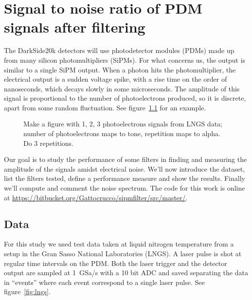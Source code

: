 \chapter{Signal to noise ratio of PDM signals after filtering}


The DarkSide20k detectors will use photodetector modules (PDMs) made up from
many silicon photomultipliers (SiPMs). For what concerns us, the output is
similar to a single SiPM output. When a photon hits the photomultiplier, the
electrical output is a sudden voltage spike, with a rise time on the order of
nanoseconds, which decays slowly in some microseconds. The amplitude of this
signal is proportional to the number of photoelectrons produced, so it is
discrete, apart from some random fluctuation. See figure~\ref{fig:signals} for
an example.

\begin{figure}
    Make a figure with 1, 2, 3 photoelectrons signals from LNGS data; number of
    photoelectrons maps to tone, repetition maps to alpha. Do 3 repetitions.
    \caption{}
    \label{fig:signals}
\end{figure}

Our goal is to study the performance of some filters in finding and measuring the amplitude of the signals amidst electrical noise. We'll now introduce the dataset, list the filters tested, define a performance measure and show the results. Finally we'll compute and comment the noise spectrum. The code for this work is online at \url{https://bitbucket.org/Gattocrucco/sipmfilter/src/master/}.

\section{Data}

For this study we used test data taken at liquid nitrogen temperature from a setup in the Gran Sasso National Laboratories (LNGS). A laser pulse is shot at regular time intervals on the PDM. Both the laser trigger and the detector output are sampled at \SI{1}{GSa/s} with a 10 bit ADC and saved separating the data in ``events'' where each event correspond to a single laser pulse. See figure~\ref{fig:lngs}.

